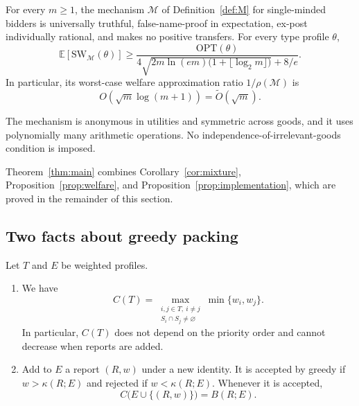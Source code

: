 \documentclass[format=acmsmall, review=false]{acmart}
\newcommand{\E}{\mathbb{E}}
\newcommand{\OPT}{\mathrm{OPT}}
\newcommand{\SW}{\mathrm{SW}}
\begin{document}
\begin{theorem}\label{thm:main}
For every \(m\ge1\), the mechanism \(\mathcal M\) of
Definition~\ref{def:M} for single-minded bidders is universally
truthful, false-name-proof in expectation, ex-post individually
rational, and makes no positive transfers. For every type
profile \(\theta\),
\[
\E[\SW_{\mathcal M}(\theta)]
\ge
\frac{\OPT(\theta)}{
4\sqrt{2m\ln(em)\bigl(1+\lfloor\log_2m\rfloor\bigr)}+8/e}.
\]
In particular, its worst-case welfare approximation ratio
\(1/\rho(\mathcal M)\) is
\[
O(\sqrt m\log(m+1))=\widetilde O(\sqrt m).
\]

The mechanism is anonymous in utilities and symmetric across
goods, and it uses polynomially many arithmetic operations. No
independence-of-irrelevant-goods condition is imposed.
\end{theorem}

Theorem~\ref{thm:main} combines
Corollary~\ref{cor:mixture}, Proposition~\ref{prop:welfare}, and
Proposition~\ref{prop:implementation}, which are proved in the
remainder of this section.

\subsection{Two facts about greedy packing}
\label{sec:rand-greedy}

\begin{lemma}
\label{lem:greedy}
Let \(T\) and \(E\) be weighted profiles.
\begin{enumerate}
\item[(a)] We have
\begin{equation}\label{eq:pair}
C(T)=
\max_{\substack{i,j\in T,\ i\ne j\\
                 S_i\cap S_j\ne\varnothing}}
\min\{w_i,w_j\}.
\end{equation}
In particular, \(C(T)\) does not depend on the priority order and
cannot decrease when reports are added.
\item[(b)] Add to \(E\) a report \((R,w)\) under a new identity.
It is accepted by greedy if \(w>\kappa(R;E)\) and rejected if
\(w<\kappa(R;E)\). Whenever it is accepted,
\begin{equation}\label{eq:normalizer}
C\bigl(E\cup\{(R,w)\}\bigr)=B(R;E).
\end{equation}
\end{enumerate}
\end{lemma}
\end{document}
